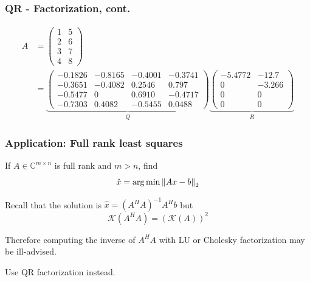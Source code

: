 \documentclass{beamer}
\begin{document}
\begin{frame}\frametitle{QR - Factorization, cont.}
	\begin{example}
		\begin{align*}
			A &= \begin{pmatrix}
					1 & 5\\
					2 & 6\\
					3 & 7\\
					4 & 8
				\end{pmatrix} \\
			&=  \underbrace{
				\begin{pmatrix}
					-0.1826 & -0.8165 & -0.4001 & -0.3741\\
					-0.3651 & -0.4082 & 0.2546 & 0.797\\
					-0.5477 & 0 & 0.6910 & -0.4717\\
					-0.7303 & 0.4082 & -0.5455 & 0.0488
				\end{pmatrix}}_{Q}
				\underbrace{
				\begin{pmatrix}
					-5.4772 & -12.7\\
					0 & -3.266\\
					0 & 0\\
					0 & 0
				\end{pmatrix}}_{R}
		\end{align*}
	\end{example}	
\end{frame}

\begin{frame}\frametitle{Application: Full rank least squares}
	If $A \in \mathbb{C}^{m\times n}$ is full rank and $m > n$, find 
	\[ \hat{x} = \arg\min\left\|Ax-b \right\|_2 \]
	
	\vfill
	
	Recall that the solution is $\hat{x} = (A^HA)^{-1}A^Hb$ but
	\[ \mathcal{K}(A^HA) = (\mathcal{K}(A))^2 \]
	
	Therefore computing the inverse of $A^HA$ with LU or Cholesky factorization may be ill-advised. 
	
	\vfill
	
	Use QR factorization instead.
	
\end{frame}
\end{document}
